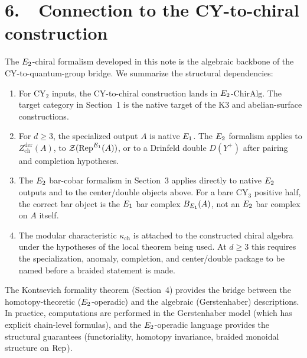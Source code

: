 
\section*{6.\ \ Connection to the CY-to-chiral construction}
\label{note:sec:outlook}

The $E_2$-chiral formalism developed in this note is the algebraic
backbone of the CY-to-quantum-group bridge. We summarize the
structural dependencies:

\begin{enumerate}[label=(\arabic*)]
 \item For CY$_2$ inputs, the CY-to-chiral construction lands in
 $E_2$-$\mathrm{ChirAlg}$. The target category in Section~1 is the
 native target of the K3 and abelian-surface constructions.

 \item For $d \geq 3$, the specialized output $A$ is native $E_1$.
 The $E_2$ formalism applies to
 $Z_{\mathrm{ch}}^{\mathrm{der}}(A)$, to
 $\mathcal{Z}(\mathrm{Rep}^{E_1}(A))$, or to a Drinfeld double
 $D(Y^+)$ after pairing and completion hypotheses.

 \item The $E_2$ bar-cobar formalism in Section~3 applies directly to
 native $E_2$ outputs and to the center/double objects above. For a
 bare CY$_3$ positive half, the correct bar object is the $E_1$ bar
 complex $B_{E_1}(A)$, not an $E_2$ bar complex on $A$ itself.

 \item The modular characteristic $\kappa_{\mathrm{ch}}$ is attached to
 the constructed chiral algebra under the hypotheses of the local
 theorem being used. At $d \geq 3$ this requires the specialization,
 anomaly, completion, and center/double package to be named before a
 braided statement is made.
\end{enumerate}

The Kontsevich formality theorem (Section~4) provides the bridge
between the homotopy-theoretic ($E_2$-operadic) and the algebraic
(Gerstenhaber) descriptions. In practice, computations are performed
in the Gerstenhaber model (which has explicit chain-level formulas),
and the $E_2$-operadic language provides the structural guarantees
(functoriality, homotopy invariance, braided monoidal structure on
$\mathrm{Rep}$).
